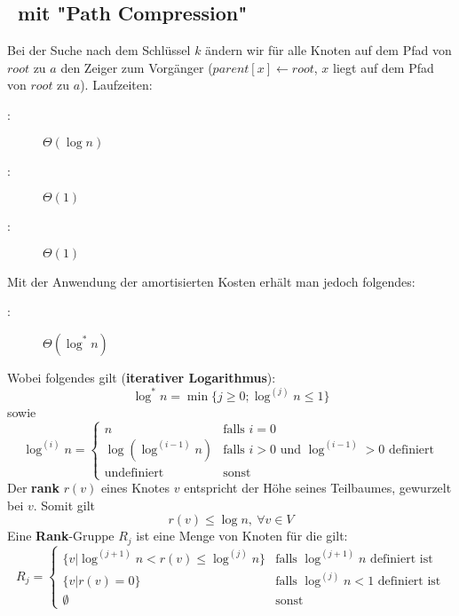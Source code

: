 \subsection{\find~mit "Path Compression"}
Bei der Suche nach dem Schlüssel $k$ ändern wir für alle Knoten auf dem Pfad von $root$ zu $a$ den Zeiger zum Vorgänger ($parent[x] \leftarrow root$, $x$ liegt auf dem Pfad von $root$ zu $a$).
Laufzeiten:
\begin{description}
	\item[\find:] $\Theta(\log n)$
	\item[\union:] $\Theta(1)$
	\item[\makeset:] $\Theta(1)$
\end{description}
Mit der Anwendung der amortisierten Kosten erhält man jedoch folgendes:
\begin{description}
	\item[\find:] $\Theta(\log^{*} n)$
\end{description}
Wobei folgendes gilt (\textbf{iterativer Logarithmus}):
\[\log^{*} n = \min \{j \geq 0;\log^{(j)} n \leq 1\}\]
sowie
\[\log^{(i)} n = \left\{ \begin{array}{ll}
		n & \text{falls } i=0\\
		\log(\log^{(i-1)}n) & \text{falls } i>0 \text{ und } \log^{(i-1)} >0 \text{ definiert}\\
		\text{undefiniert}&\text{sonst}
	\end{array}\right. \]
Der \textbf{rank} $r(v)$ eines Knotes $v$ entspricht der Höhe seines Teilbaumes, gewurzelt bei $v$. Somit gilt
\[r(v) \leq \log n,~\forall v \in V\]
Eine \textbf{Rank}-Gruppe $R_j$ ist eine Menge von Knoten für die gilt:
\[R_j=\left\{
	\begin{array}{ll}
		\{v | \log^{(j+1)} n < r(v) \leq \log^{(j)}n\} & \text{falls } \log^{(j+1)} n \text{ definiert ist}\\
		\{v | r(v) = 0\} & \text{falls } \log^{(j)} n < 1 \text{ definiert ist}\\
		\emptyset & \text{sonst}
	\end{array}
\right.\]
\topbreak
\up
{}
